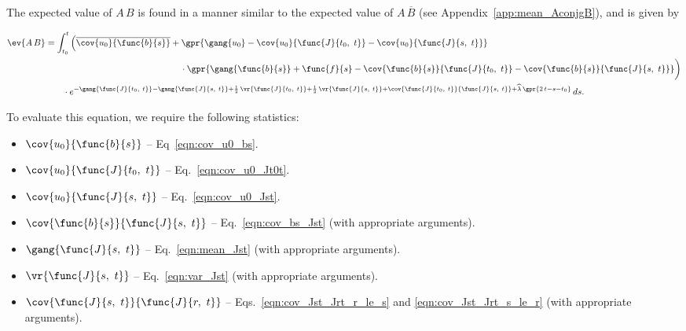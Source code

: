 The expected value of $A\,B$ is found in a manner similar to the expected value of $A\,\overline{B}$ (see Appendix~\ref{app:mean_AconjgB}), and is given by

\begin{align}
    \ev{A\,B} &= \int_{t_0}^{t} \left( \overline{\cov{u_0}{\func{b}{s}}} + \gpr{\gang{u_0} - \cov{u_0}{\func{J}{t_0,\ t}} - \cov{u_0}{\func{J}{s,\ t}}} \right. \nonumber \\
    		&\left.\phantom{\int_{t_0}^{t} \overline{\cov{u_0}{\func{b}{s}}} +}\qquad  \cdot \gpr{\gang{\func{b}{s}} + \func{f}{s} - \cov{\func{b}{s}}{\func{J}{t_0,\ t}} - \cov{\func{b}{s}}{\func{J}{s,\ t}}} \right) \nonumber \\
    		&\qquad \cdot e^{-\gang{\func{J}{t_0,\ t}} - \gang{\func{J}{s,\ t}} + \frac{1}{2}\,\vr{\func{J}{t_0,\ t}} + \frac{1}{2}\,\vr{\func{J}{s,\ t}} + \cov{\func{J}{t_0,\ t}}{\func{J}{s,\ t}} + \widehat{\lambda}\,\gpr{2\,t - s - t_0}}\,ds. \label{eqn:mean_AB}
\end{align}

To evaluate this equation, we require the following statistics:

\begin{itemize}
	\item [] $\cov{u_0}{\func{b}{s}}$ -- Eq~\ref{eqn:cov_u0_bs}.
	\item [] $\cov{u_0}{\func{J}{t_0,\ t}}$ -- Eq.~\ref{eqn:cov_u0_Jt0t}.
	\item [] $\cov{u_0}{\func{J}{s,\ t}}$ -- Eq.~\ref{eqn:cov_u0_Jst}.
	\item [] $\cov{\func{b}{s}}{\func{J}{s,\ t}}$ -- Eq.~\ref{eqn:cov_bs_Jst} (with appropriate arguments).
	\item [] $\gang{\func{J}{s,\ t}}$ -- Eq.~\ref{eqn:mean_Jst} (with appropriate arguments).
	\item [] $\vr{\func{J}{s,\ t}}$ -- Eq.~\ref{eqn:var_Jst} (with appropriate arguments).
	\item [] $\cov{\func{J}{s,\ t}}{\func{J}{r,\ t}}$ -- Eqs.~\ref{eqn:cov_Jst_Jrt_r_le_s} and \ref{eqn:cov_Jst_Jrt_s_le_r} (with appropriate arguments).
\end{itemize}

